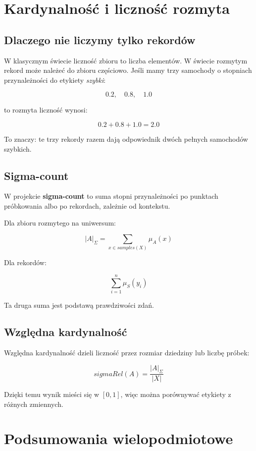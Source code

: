 \documentclass[11pt,a4paper]{article}
\newcommand{\term}[1]{\textbf{#1}}
\begin{document}
\section{Kardynalność i liczność rozmyta}

\subsection{Dlaczego nie liczymy tylko rekordów}

W klasycznym świecie liczność zbioru to liczba elementów. W świecie rozmytym rekord może należeć do zbioru częściowo. Jeśli mamy trzy samochody o stopniach przynależności do etykiety \emph{szybki}:

\[
0.2,\quad 0.8,\quad 1.0
\]

to rozmyta liczność wynosi:

\[
0.2+0.8+1.0=2.0
\]

To znaczy: te trzy rekordy razem dają odpowiednik dwóch pełnych samochodów szybkich.

\subsection{Sigma-count}

W projekcie \term{sigma-count} to suma stopni przynależności po punktach próbkowania albo po rekordach, zależnie od kontekstu.

Dla zbioru rozmytego na uniwersum:

\[
|A|_\Sigma = \sum_{x \in samples(X)} \mu_A(x)
\]

Dla rekordów:

\[
\sum_{i=1}^{n}\mu_S(y_i)
\]

Ta druga suma jest podstawą prawdziwości zdań.

\subsection{Względna kardynalność}

Względna kardynalność dzieli liczność przez rozmiar dziedziny lub liczbę próbek:

\[
sigmaRel(A)=\frac{|A|_\Sigma}{|X|}
\]

Dzięki temu wynik mieści się w \([0,1]\), więc można porównywać etykiety z różnych zmiennych.

\section{Podsumowania wielopodmiotowe}
\end{document}
